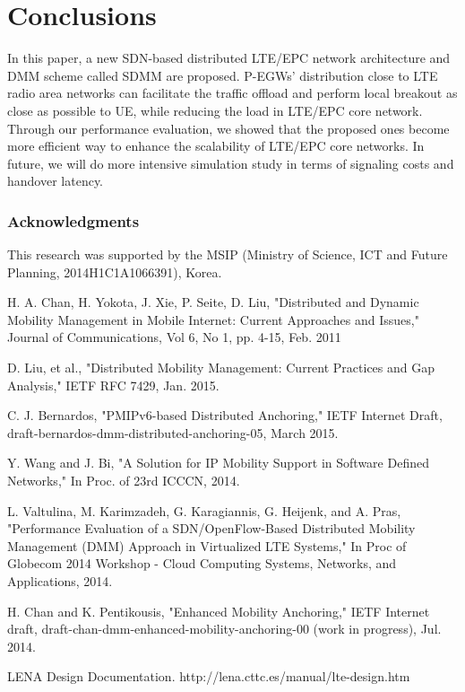 \documentclass[runningheads,a4paper]{llncs}
\begin{document}
\section{Conclusions}


In this paper, a new SDN-based distributed LTE/EPC network architecture and DMM scheme called SDMM are proposed. P-EGWs' distribution close to LTE radio area networks can facilitate the traffic offload and perform local breakout as close as possible to UE, while reducing the load in LTE/EPC core network. Through our performance evaluation, we showed that the proposed ones become more efficient way to enhance the scalability of LTE/EPC core networks. In future, we will do more intensive simulation study in terms of signaling costs and handover latency.

\subsubsection*{Acknowledgments} This research was supported by the MSIP (Ministry of Science, ICT and Future Planning, 2014H1C1A1066391), Korea.

\begin{thebibliography}{4}

 H. A. Chan, H. Yokota, J. Xie, P. Seite, D. Liu, "Distributed and Dynamic Mobility Management in Mobile Internet: Current Approaches and Issues," Journal of Communications, Vol 6, No 1, pp. 4-15, Feb. 2011

 D. Liu, et al., "Distributed Mobility Management: Current Practices and Gap Analysis," IETF RFC 7429, Jan. 2015.

 C. J. Bernardos, "PMIPv6-based Distributed Anchoring," IETF Internet Draft, draft-bernardos-dmm-distributed-anchoring-05, March 2015.

 Y. Wang and J. Bi, "A Solution for IP Mobility Support in Software Defined Networks," In Proc. of 23rd ICCCN, 2014.

 L. Valtulina, M. Karimzadeh, G. Karagiannis, G. Heijenk, and A. Pras, "Performance Evaluation of a SDN/OpenFlow-Based Distributed Mobility Management (DMM) Approach in Virtualized LTE Systems," In Proc of Globecom 2014 Workshop - Cloud Computing Systems, Networks, and Applications, 2014.

 H. Chan and K. Pentikousis, "Enhanced Mobility Anchoring," IETF Internet draft, draft-chan-dmm-enhanced-mobility-anchoring-00 (work in progress), Jul. 2014.

 LENA Design Documentation. http://lena.cttc.es/manual/lte-design.htm

\end{thebibliography}
\end{document}
